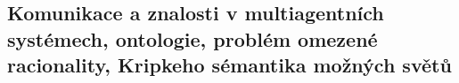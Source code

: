 \subsection{Komunikace a znalosti v multiagentních systémech, ontologie, problém omezené racionality, Kripkeho sémantika možných světů}